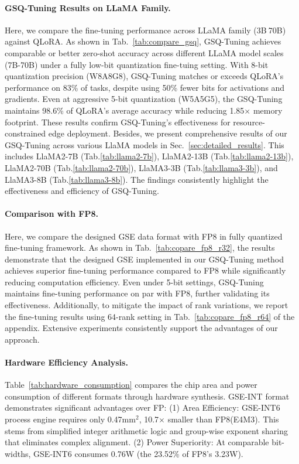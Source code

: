 \paragraph{GSQ-Tuning Results on LLaMA Family.} Here, we compare the fine-tuning performance across LLaMA family (3B$~$70B) against QLoRA. As shown in Tab.~\ref{tab:compare_gsq}, GSQ-Tuning achieves comparable or better zero-shot accuracy across different LLaMA model scales (7B-70B) under a fully low-bit quantization fine-tuing setting. With 8-bit quantization precision (W8A8G8), GSQ-Tuning matches or exceeds QLoRA's performance on 83\% of tasks, despite using 50\% fewer bits for activations and gradients. Even at aggressive 5-bit quantization (W5A5G5), the GSQ-Tuning maintains 98.6\% of QLoRA's average accuracy while reducing 1.85$\times$ memory footprint. These results confirm GSQ-Tuning's effectiveness for resource-constrained edge deployment. Besides, we present comprehensive results of our GSQ-Tuning across various LlaMA models in Sec.~\ref{sec:detailed_results}. This includes LlaMA2-7B (Tab.\ref{tab:llama2-7b}), LlaMA2-13B (Tab.\ref{tab:llama2-13b}), LlaMA2-70B (Tab.\ref{tab:llama2-70b}), LlaMA3-3B (Tab.\ref{tab:llama3-3b}), and LlaMA3-8B (Tab.\ref{tab:llama3-8b}). The findings consistently highlight the effectiveness and efficiency of GSQ-Tuning.






\paragraph{Comparison with FP8.} Here, we compare the designed GSE data format with FP8 in fully quantized fine-tuning framework. As shown in Tab.~\ref{tab:copare_fp8_r32}, the results demonstrate that the designed GSE implemented in our GSQ-Tuning method achieves superior fine-tuning performance compared to FP8 while significantly reducing computation efficiency. Even under 5-bit settings, GSQ-Tuning maintains fine-tuning performance on par with FP8, further validating its effectiveness. Additionally, to mitigate the impact of rank variations, we report the fine-tuning results using 64-rank setting in Tab.~\ref{tab:copare_fp8_r64} of the appendix. Extensive experiments consistently support the advantages of our approach.
% 


\paragraph{Hardware Efficiency Analysis.} Table~\ref{tab:hardware_consumption} compares the chip area and power consumption of different formats through hardware synthesis. GSE-INT format demonstrates significant advantages over FP: (1) Area Efficiency: GSE-INT6 process engine requires only 0.47mm$^2$, 10.7$\times$ smaller than FP8(E4M3). This stems from simplified integer arithmetic logic and group-wise exponent sharing that eliminates complex alignment. (2) Power Superiority: At comparable bit-widths, GSE-INT6 consumes 0.76W (the 23.52\% of FP8's 3.23W).

